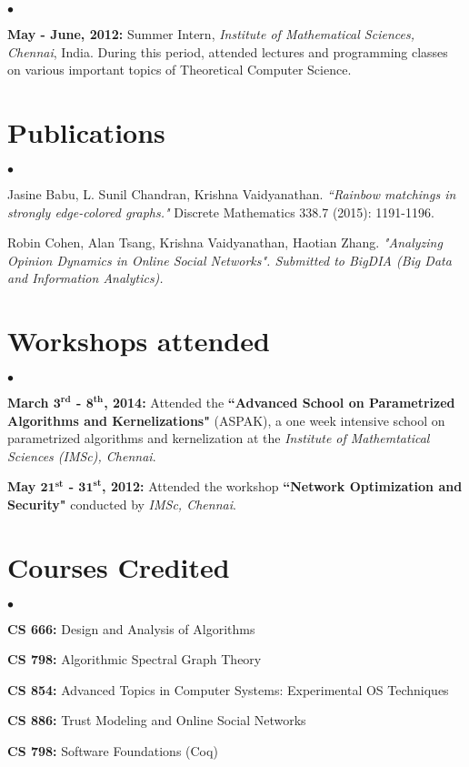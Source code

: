 \documentclass[margin,line]{res}
\newenvironment{list2}{
  \begin{list}{$\bullet$}{%
      \setlength{\itemsep}{0in}
      \setlength{\parsep}{0in} \setlength{\parskip}{0in}
      \setlength{\topsep}{0in} \setlength{\partopsep}{0in} 
      \setlength{\leftmargin}{0.2in}}}{\end{list}}
\begin{document}
\begin{resume}
\begin{list2}
\item \textbf{May - June, 2012:} Summer Intern, \textit{Institute of Mathematical Sciences, Chennai}, India. During this period, attended lectures and programming classes on various important topics of Theoretical Computer Science.
\end{list2}

\section{\sc Publications}
\begin{list2}
\item Jasine  Babu,  L.  Sunil  Chandran, Krishna  Vaidyanathan. \textit{``Rainbow matchings in strongly edge-colored graphs."} Discrete Mathematics 338.7 (2015):  1191-1196.
\item Robin Cohen, Alan Tsang, Krishna Vaidyanathan, Haotian Zhang. 
    \textit{"Analyzing Opinion Dynamics in Online Social Networks". Submitted to 
        BigDIA (Big Data and Information Analytics).} \end{list2}

\section{\sc Workshops attended}
\begin{list2}
\item \textbf{March $\mathbf{3^{rd}}$ - $\mathbf{8^{th}}$, 2014:} Attended the \textbf{``Advanced School on Parametrized Algorithms and Kernelizations"} (ASPAK), a one week intensive school on parametrized algorithms and kernelization at the \textit{Institute of Mathemtatical Sciences (IMSc), Chennai}.

\item  \textbf{May $\mathbf{21^{st}}$ - $\mathbf{31^{st}}$, 2012:} Attended the workshop \textbf{``Network Optimization and Security"} conducted by \textit{IMSc, Chennai}.
\end{list2}

\section{\sc Courses Credited}
\begin{list2}
\item \textbf{CS 666:} Design and Analysis of Algorithms
\item \textbf{CS 798:} Algorithmic Spectral Graph Theory
\item \textbf{CS 854:} Advanced Topics in Computer Systems: Experimental OS Techniques
\item \textbf{CS 886:} Trust Modeling and Online Social Networks
\item \textbf{CS 798:} Software Foundations (Coq)
\end{list2}

\end{resume}
\end{document}

